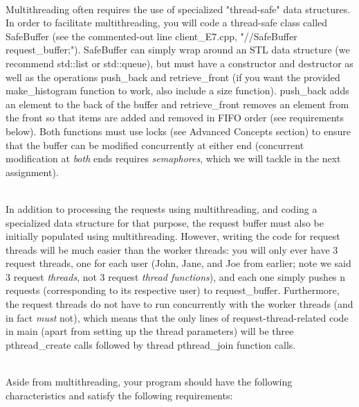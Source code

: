\documentclass[12pt]{extarticle}
\newenvironment{myindentpar}[1]%
 {\begin{list}{}%
         {\setlength{\leftmargin}{#1}}%
         \item[]%
 }
 {\end{list}}
\begin{document}
\begin{myindentpar}{5mm}
	\ \\
	Multithreading often requires the use of specialized "thread-safe" data structures. In order to facilitate multithreading, you will code a thread-safe class called SafeBuffer (see the commented-out line client\_E7.cpp, "//SafeBuffer request\_buffer;"). SafeBuffer can simply wrap around an STL data structure (we recommend std::list or std::queue), but must have a constructor and destructor as well as the operations push\_back and retrieve\_front (if you want the provided make\_histogram function to work, also include a size function). push\_back adds an element to the back of the buffer and retrieve\_front removes an element from the front so that items are added and removed in FIFO order (see requirements below). Both functions must use locks (see Advanced Concepts section) to ensure that the buffer can be modified concurrently at either end (concurrent modification at \emph{both} ends requires \emph{semaphores}, which we will tackle in the next assignment).
	
	\ \\
	In addition to processing the requests using multithreading, and coding a specialized data structure for that purpose, the request buffer must also be initially populated using multithreading. However, writing the code for request threads will be much easier than the worker threads: you will only ever have 3 request threads, one for each user (John, Jane, and Joe from earlier; note we said 3 request \emph{threads}, not 3 request \emph{thread functions}), and each one simply pushes n requests (corresponding to its respective user) to request\_buffer. Furthermore, the request threads do not have to run concurrently with the worker threads (and in fact \emph{must} not), which means that the only lines of request-thread-related code in main (apart from setting up the thread parameters) will be three pthread\_create calls followed by thread pthread\_join function calls.
	
	\ \\
	Aside from multithreading, your program should have the following characteristics and satisfy the following requirements:
	\begin{itemize}
	    \setlength\itemsep{-0.1em}
	    

\end{itemize}
\end{myindentpar}
\end{document}
